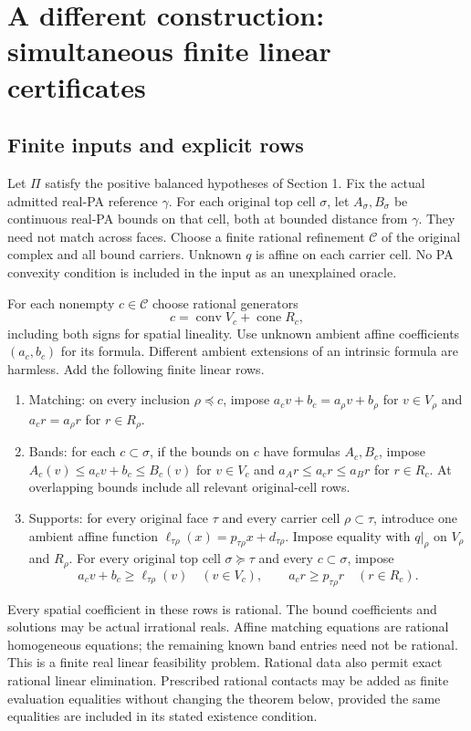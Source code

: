 \documentclass[11pt]{article}
\newcommand{\conv}{\operatorname{conv}}
\newcommand{\cone}{\operatorname{cone}}
\begin{document}
\section{A different construction: simultaneous finite linear certificates}
\subsection{Finite inputs and explicit rows}
Let $\Pi$ satisfy the positive balanced hypotheses of Section 1. Fix the actual admitted real-PA reference $\gamma$. For each original top cell $\sigma$, let $A_\sigma,B_\sigma$ be continuous real-PA bounds on that cell, both at bounded distance from $\gamma$. They need not match across faces. Choose a finite rational refinement $\mathcal C$ of the original complex and all bound carriers. Unknown $q$ is affine on each carrier cell. No PA convexity condition is included in the input as an unexplained oracle.

For each nonempty $c\in\mathcal C$ choose rational generators
\[
 c=\conv V_c+\cone R_c,
\]
including both signs for spatial lineality. Use unknown ambient affine coefficients $(a_c,b_c)$ for its formula. Different ambient extensions of an intrinsic formula are harmless. Add the following finite linear rows.
\begin{enumerate}
\item Matching: on every inclusion $\rho\preceq c$, impose $a_c v+b_c=a_\rho v+b_\rho$ for $v\in V_\rho$ and $a_c r=a_\rho r$ for $r\in R_\rho$.
\item Bands: for each $c\subset\sigma$, if the bounds on $c$ have formulas $A_c,B_c$, impose $A_c(v)\leq a_cv+b_c\leq B_c(v)$ for $v\in V_c$ and $a_A r\leq a_c r\leq a_B r$ for $r\in R_c$. At overlapping bounds include all relevant original-cell rows.
\item Supports: for every original face $\tau$ and every carrier cell $\rho\subset\tau$, introduce one ambient affine function $\ell_{\tau\rho}(x)=p_{\tau\rho}x+d_{\tau\rho}$. Impose equality with $q|_\rho$ on $V_\rho$ and $R_\rho$. For every original top cell $\sigma\succeq\tau$ and every $c\subset\sigma$, impose
\[
 a_cv+b_c\geq\ell_{\tau\rho}(v)\quad(v\in V_c),\qquad
 a_cr\geq p_{\tau\rho}r\quad(r\in R_c).                            \tag{5.1}
\]
\end{enumerate}
Every spatial coefficient in these rows is rational. The bound coefficients and solutions may be actual irrational reals. Affine matching equations are rational homogeneous equations; the remaining known band entries need not be rational. This is a finite real linear feasibility problem. Rational data also permit exact rational linear elimination. Prescribed rational contacts may be added as finite evaluation equalities without changing the theorem below, provided the same equalities are included in its stated existence condition.
\end{document}

